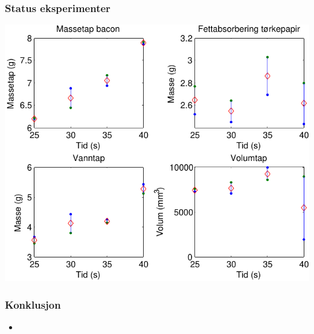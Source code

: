 \documentclass[screen]{beamer}
\begin{document}
\begin{frame}
  \frametitle{Status eksperimenter}
    \begin{center}
      \includegraphics[width=0.7\linewidth]{eksperiment.pdf}
    \end{center}
\end{frame}

\begin{frame}
  \frametitle{Konklusjon}
  \begin{itemize}
    \item 
  \end{itemize}
\end{frame}
\end{document}
